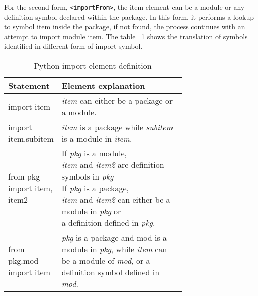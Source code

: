 For the second form, \texttt{<importFrom>}, the item element can be a module or any definition symbol declared within the package. In this form, it performs a lookup to symbol item inside the package, if not found, the process continues with an attempt to import module item. The table ~\ref{table:python-import-def} shows the translation of symbols identified in different form of import symbol.

\begin{table}[ht]
    \centering
    \begin{tabular}{ |l|p{0.7\linewidth}| }
        \hline
        Statement                   & Element explanation                                                                                                                                                 \\
        \hline
        import item                 & \textit{item} can either be a package or a module.                                                                                                                  \\
        \hline
        import item.subitem         & \textit{item} is a package while \textit{subitem} is a module in \textit{item}.                                                                                     \\
        \hline
        from pkg import item, item2 &
        \makecell[l]
        {If \textit{pkg} is a module,                                                                                                                                                                     \\ \textit{item} and \textit{item2} are definition symbols in \textit{pkg}                                                            \\
            If \textit{pkg} is a package,                                                                                                                                                                 \\ \textit{item} and \textit{item2} can either be a module in \textit{pkg} or \\ a definition defined in \textit{pkg}.
        }                                                                                                                                                                                                 \\
        \hline
        from pkg.mod import item    & \textit{pkg} is a package and mod is a module in \textit{pkg}, while \textit{item} can be a module of \textit{mod}, or a definition symbol defined in \textit{mod}. \\
        \hline
    \end{tabular}
    \caption{Python import element definition}
    \label{table:python-import-def}
\end{table}

